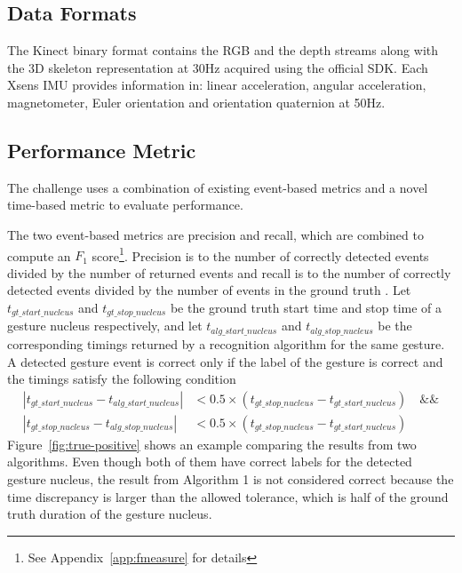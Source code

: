 \subsection{Data Formats}
The Kinect binary format contains the RGB and the depth streams along with the
3D skeleton representation at 30Hz acquired using the official SDK. Each Xsens IMU
provides information in: linear acceleration, angular acceleration,
magnetometer, Euler orientation and orientation quaternion at 50Hz.

\subsection{Performance Metric}\label{sec:chairgest-metric}
The challenge uses a combination of existing event-based metrics and a novel
time-based metric to evaluate performance. 

The two event-based metrics are
precision and recall, which are combined to compute an $F_1$ score\footnote{See
Appendix~\ref{app:fmeasure} for details}.
Precision is to the number of correctly detected events divided by the number of returned events and recall 
is to the number of correctly detected events divided by the number of
events in the ground truth \cite{Ruffieux2013}. Let
$t_{gt\_start\_nucleus}$ and $t_{gt\_stop\_nucleus}$ be the ground truth start time and stop time of a gesture nucleus respectively,
and let $t_{alg\_start\_nucleus}$ and $t_{alg\_stop\_nucleus}$ be the
corresponding timings returned by a recognition algorithm for the same gesture.
A detected gesture event is correct only if the label of the gesture is
correct and the timings satisfy the following condition
\begin{align*}
|t_{gt\_start\_nucleus} - t_{alg\_start\_nucleus}| &< 0.5\times
(t_{gt\_stop\_nucleus} - t_{gt\_start\_nucleus}) \quad \text{\&\&} \\
|t_{gt\_stop\_nucleus} - t_{alg\_stop\_nucleus}| &< 0.5\times
(t_{gt\_stop\_nucleus} - t_{gt\_start\_nucleus})
\end{align*}
Figure~\ref{fig:true-positive} shows an example comparing the results from two
algorithms. Even though both of them have correct labels for the detected
gesture nucleus, the result from Algorithm 1 is not considered correct because
the time discrepancy is larger than the allowed tolerance, which is half of the
ground truth duration of the gesture nucleus.

